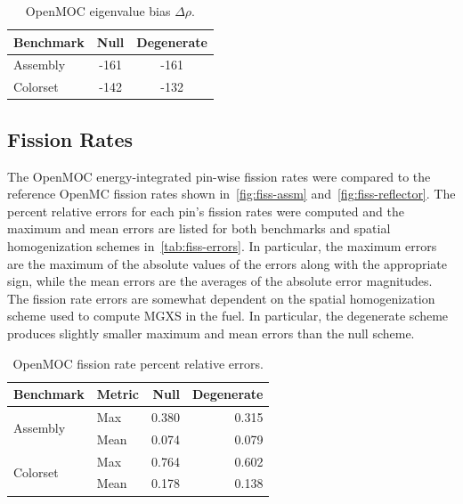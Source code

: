 \begin{table}[h!]
  \centering
  \caption{OpenMOC eigenvalue bias $\Delta\rho$.}
  \label{tab:keff-bias} 
  \begin{tabular}{l c c}
  \toprule
  \textbf{Benchmark} & \textbf{Null} & \textbf{Degenerate} \\
  \midrule
  Assembly & -161 & -161 \\
  Colorset & -142 & -132 \\
  \bottomrule
\end{tabular}
\end{table}


\subsection{Fission Rates}
\label{subsec:fiss-rates}

The OpenMOC energy-integrated pin-wise fission rates were compared to the reference OpenMC fission rates shown in~\autoref{fig:fiss-assm} and~\autoref{fig:fiss-reflector}. The percent relative errors for each pin's fission rates were computed and the maximum and mean errors are listed for both benchmarks and spatial homogenization schemes in~\autoref{tab:fiss-errors}. In particular, the maximum errors are the maximum of the absolute values of the errors along with the appropriate sign, while the mean errors are the averages of the absolute error magnitudes. The fission rate errors are somewhat dependent on the spatial homogenization scheme used to compute MGXS in the fuel. In particular, the degenerate scheme produces slightly smaller maximum and mean errors than the null scheme.

\begin{table}[h!]
  \centering
  \caption{OpenMOC fission rate percent relative errors.}
  \label{tab:fiss-errors}
  \begin{tabular}{l l r r}
  \toprule
  \textbf{Benchmark} & \textbf{Metric} & \textbf{Null} & \textbf{Degenerate} \\
  \midrule
  \multirow{2}{*}{Assembly} & Max  & 0.380 & 0.315 \\
                            & Mean & 0.074 & 0.079 \\
  \midrule
  \multirow{2}{*}{Colorset} & Max  & 0.764 & 0.602 \\
                            & Mean & 0.178 & 0.138 \\
  \bottomrule
\end{tabular}
\end{table}

